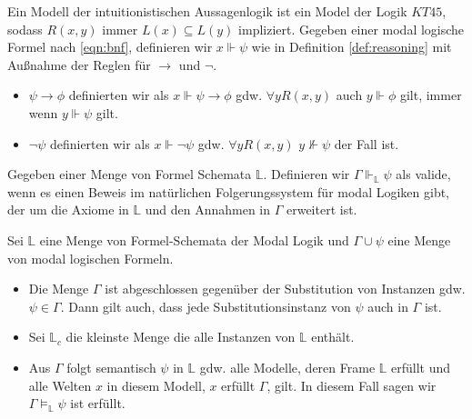 \begin{definition}
	Ein Modell der intuitionistischen Aussagenlogik ist ein Model \modelFormel der Logik $KT45$, sodass $R(x,y)$ immer $L(x) \subseteq L(y)$ impliziert.
	Gegeben einer modal logische Formel nach \eqref{eqn:bnf}, definieren wir $x \Vdash \psi$ wie in Definition \eqref{def:reasoning} mit Außnahme der Reglen für $\rightarrow$ und $\neg$.
	\begin{itemize}
		\item $\psi \rightarrow \phi$ definierten wir als $x \Vdash \psi \rightarrow \phi$ gdw. $\forall y R(x,y)$ auch $y \Vdash \phi$ gilt, immer wenn $y \Vdash \psi$ gilt.
		\item $\neg \psi$ definierten wir als $x \Vdash \neg \psi$ gdw. $\forall y R(x,y)$ $y \nVdash \psi$ der Fall ist.
	\end{itemize}
\end{definition}
\cite[S.328]{huth2004logic}

\begin{definition}
	Gegeben einer Menge von Formel Schemata $\mathds{L}$.
	Definieren wir $\Gamma \Vdash_\mathds{L} \psi$ als valide, wenn es einen Beweis im natürlichen Folgerungssystem für modal Logiken gibt, der um die Axiome in $\mathds{L}$ und den Annahmen in $\Gamma$ erweitert ist.
\end{definition}
\cite[S.330]{huth2004logic}

\begin{definition}
	\label{def:substitution}
	Sei $\mathds{L}$ eine Menge von Formel-Schemata der Modal Logik und $\Gamma \cup {\psi}$ eine Menge von modal logischen Formeln.
	
	\begin{itemize}
		\item Die Menge $\Gamma$ ist abgeschlossen gegenüber der Substitution von Instanzen gdw.  $\psi \in \Gamma$. 
		Dann gilt auch, dass jede Substitutionsinstanz von $\psi$ auch in $\Gamma$ ist.
		\item Sei $\mathds{L}_c$ die kleinste Menge die alle Instanzen von $\mathds{L}$ enthält.
		\item Aus $\Gamma$ folgt semantisch $\psi$ in $\mathds{L}$ gdw. alle Modelle, deren Frame $\mathds{L}$ erfüllt und alle Welten $x$ in diesem Modell, $x$ erfüllt $\Gamma$, gilt.
		In diesem Fall sagen wir $\Gamma \vDash_{\mathds{L}} \psi$ ist erfüllt.
	\end{itemize}
	\cite[S.326]{huth2004logic}
\end{definition}




